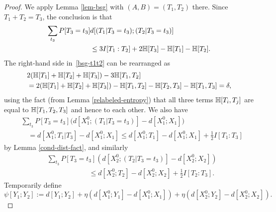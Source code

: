 \begin{proof}
  We apply Lemma \ref{lem-bsg} with $(A,B) = (T_1, T_2)$ there.
  Since $T_1 + T_2 = T_3$, the conclusion is that
  \begin{align} \nonumber \sum_{t_3} P[T_3 = t_3] & d[(T_1 | T_3 = t_3); (T_2 | T_3 = t_3)] \\ & \leq 3 I[T_1 : T_2] + 2 \mathbb{H}[T_3] - \mathbb{H}[T_1] - \mathbb{H}[T_2].\label{bsg-t1t2}
  \end{align}
  The right-hand side in~\eqref{bsg-t1t2} can be rearranged as
  \begin{align*} & 2( \mathbb{H}[T_1] + \mathbb{H}[T_2] + \mathbb{H}[T_3]) - 3 \mathbb{H}[T_1,T_2] \\ & = 2(\mathbb{H}[T_1] + \mathbb{H}[T_2] + \mathbb{H}[T_3]) - \mathbb{H}[T_1,T_2] - \mathbb{H}[T_2,T_3] - \mathbb{H}[T_1, T_3] = \delta,\end{align*}
  using the fact (from Lemma \ref{relabeled-entropy}) that all three terms $\mathbb{H}[T_i,T_j]$ are equal to $\mathbb{H}[T_1,T_2,T_3]$ and hence to each other.
  We also have
  \begin{align*}
  &  \sum_{t_3} P[T_3 = t_3] \bigl(d[X^0_1; (T_1 | T_3=t_3)] - d[X^0_1;X_1]\bigr) \\
  &\quad = d[X^0_1; T_1 | T_3] - d[X^0_1;X_1] \leq d[X^0_1;T_1] - d[X^0_1;X_1] + \tfrac{1}{2} I[T_1 : T_3]
  \end{align*}
  by Lemma \ref{cond-dist-fact}, and similarly
  \begin{align*}
  &  \sum_{t_3} P[T_3 = t_3] (d[X^0_2;(T_2 | T_3=t_3)] - d[X^0_2; X_2]) \\
  &\quad\quad\quad\quad\quad\quad \leq d[X^0_2;T_2] - d[X^0_2;X_2] + \tfrac{1}{2} I[T_2 : T_3].
  \end{align*}
  Temporarily define
  \[ \psi[Y_1; Y_2] := d[Y_1;Y_2] +  \eta (d[X_1^0;Y_1] - d[X_1^0;X_1]) + \eta(d[X_2^0;Y_2] - d[X_2^0;X_2]).\]


\end{proof}
